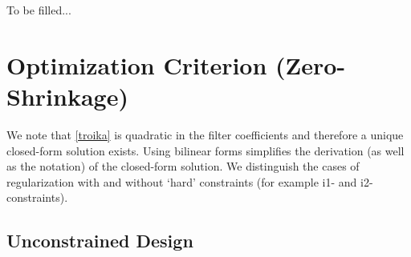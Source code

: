 \documentclass[a4paper]{book}
\begin{document}
To be filled...







\section{Optimization Criterion (Zero-Shrinkage)}\label{opt_crit_reg_tro}

We note that \ref{troika} is quadratic in the filter coefficients and therefore a unique closed-form solution exists. Using bilinear forms simplifies the derivation (as well as the notation) of the closed-form solution. We distinguish the cases of regularization with and without `hard' constraints (for example i1- and i2-constraints). 




\subsection{Unconstrained Design}\label{opt_reg_uncon}
\end{document}

